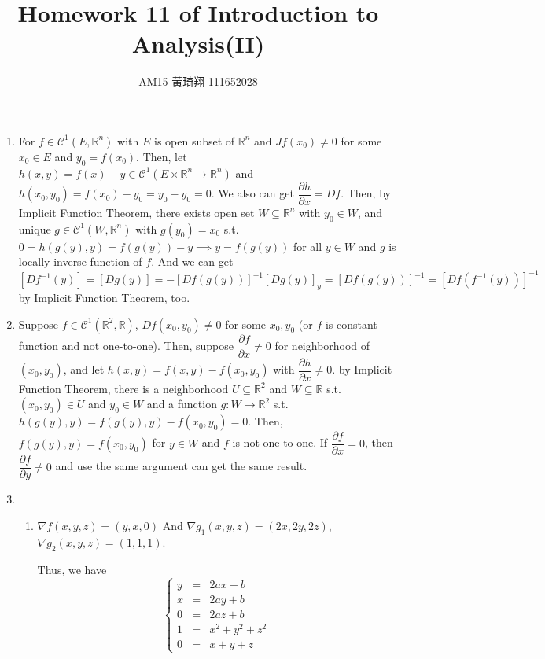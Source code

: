 \documentclass[12pt]{article}
\title{Homework 11 of Introduction to Analysis(II)}
\author{AM15 黃琦翔 111652028}
\begin{document}
\maketitle
\begin{enumerate}
    \item For $f \in \mathcal{C}^1(E, \mathbb{R}^n)$ with $E$ is open subset of $\mathbb{R}^n$ and $Jf(x_0) \neq 0$ for some $x_0\in E$ and $y_0 = f(x_0)$.
    Then, let $h(x, y) = f(x) - y \in \mathcal{C}^1(E\times \mathbb{R}^n \to \mathbb{R}^n)$ and $h(x_0, y_0) = f(x_0) - y_0 = y_0 - y_0 = 0$.
    We also can get $\dfrac{\partial h}{\partial x} = Df$.
    Then, by Implicit Function Theorem, there exists open set $W \subseteq \mathbb{R}^n$ with $y_0 \in W$,
    and unique $g \in \mathcal{C}^1(W, \mathbb{R}^n)$ with $g(y_0) = x_0$ s.t. $0 = h(g(y), y) = f(g(y)) - y \implies y = f(g(y))$ for all $y \in W$ and $g$ is locally inverse function of $f$.
    And we can get $[Df^{-1}(y)] = [Dg(y)] = - [Df(g(y))]^{-1} [Dg(y)]_y = [Df(g(y))]^{-1} = [Df(f^{-1}(y))]^{-1}$ by Implicit Function Theorem, too.    

    \item Suppose $f \in \mathcal{C}^1(\mathbb{R}^2, \mathbb{R})$, $Df(x_0, y_0) \neq 0$ for some $x_0, y_0$
    (or $f$ is constant function and not one-to-one).
    Then, suppose $\dfrac{\partial f}{\partial x} \neq 0$ for neighborhood of $(x_0, y_0)$,
    and let $h(x, y) = f(x, y) - f(x_0, y_0)$ with $\dfrac{\partial h}{\partial x} \neq 0$.
    by Implicit Function Theorem, there is a neighborhood $U \subseteq \mathbb{R}^2$ and $W \subseteq \mathbb{R}$ s.t. $(x_0, y_0) \in U$ and $y_0 \in W$ 
    and a function $g: W \to \mathbb{R}^2$ s.t. $h(g(y), y) = f(g(y), y) - f(x_0, y_0) = 0$.
    Then, $f(g(y), y) = f(x_0, y_0)$ for $y \in W$ and $f$ is not one-to-one.
    If $\dfrac{\partial f}{\partial x} = 0$, then $\dfrac{\partial f}{\partial y} \neq 0$ and use the same argument can get the same result.

    \item \begin{enumerate}
        \item $\nabla f(x, y, z) = (y, x, 0)$
        And $\nabla g_1(x, y, z) = (2x, 2y, 2z)$, $\nabla g_2(x, y, z) = (1, 1, 1)$.

        Thus, we have $$\left\{\begin{matrix}
            y &=& 2a x + b\\
            x &=& 2a y + b\\
            0 &=& 2a z + b\\
            1 &=& x^2 + y^2 + z^2\\
            0 &=& x + y + z
        \end{matrix}
        \right.
        $$


\end{enumerate}
\end{enumerate}
\end{document}
